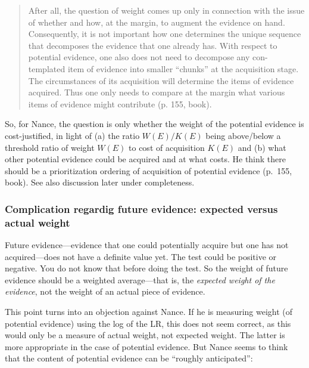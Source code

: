 \documentclass[
  10pt,
  dvipsnames,enabledeprecatedfontcommands]{scrartcl}
\begin{document}
\begin{quote}
After all, the question of weight comes up only in connection with the issue of whether and how, at the margin, to augment the evidence on hand. Consequently, it is not important how one determines the unique sequence that decomposes the evidence that one already has. With respect to potential evidence, one also does not need to decompose any con- templated item of evidence into smaller “chunks” at the acquisition stage. The circumstances of its acquisition will determine the items of evidence acquired. Thus one only needs to compare at the margin what various items of evidence might contribute (p. 155, book).
\end{quote}


So, for Nance, the question is only whether the weight of the potential
evidence is cost-justified, in light of (a) the ratio \(W(E)/K(E)\)
being above/below a threshold ratio of weight \(W(E)\) to cost of
acquisition \(K(E)\) and (b) what other potential evidence could be
acquired and at what costs. He think there should be a prioritization
ordering of acquisition of potential evidence (p.~155, book). See also
discussion later under completeness.

\hypertarget{complication-regardig-future-evidence-expected-versus-actual-weight}{%
\subsubsection{Complication regardig future evidence: expected versus
actual
weight}\label{complication-regardig-future-evidence-expected-versus-actual-weight}}

Future evidence---evidence that one could potentially acquire but one
has not acquired---does not have a definite value yet. The test could be
positive or negative. You do not know that before doing the test. So the
weight of future evidence should be a weighted average---that is, the
\textit{expected weight of the evidence}, not the weight of an actual
piece of evidence.

This point turns into an objection against Nance. If he is measuring
weight (of potential evidence) using the log of the LR, this does not
seem correct, as this would only be a measure of actual weight, not
expected weight. The latter is more appropriate in the case of potential
evidence. But Nance seems to think that the content of potential
evidence can be ``roughly anticipated'':
\end{document}
